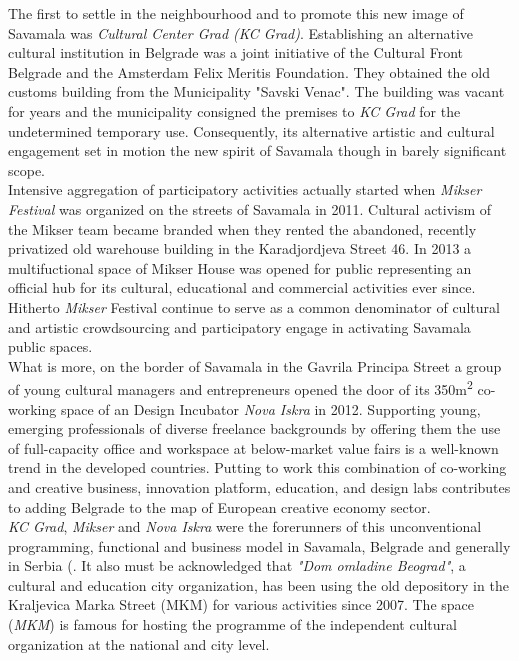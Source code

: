 \documentclass[11pt]{report}
\begin{document}
The first to settle in the neighbourhood and to promote this new image of Savamala was \textit{Cultural Center Grad (KC Grad)}. Establishing an alternative cultural institution in Belgrade was a joint initiative of the Cultural Front Belgrade and the Amsterdam Felix Meritis Foundation.
They obtained the old customs building from the Municipality "Savski Venac".
The building was vacant for years and the municipality consigned the premises to \textit{KC Grad} for the undetermined temporary use.
Consequently, its alternative artistic and cultural engagement set in motion the new spirit of Savamala though in barely significant scope.
\\
Intensive aggregation of participatory activities actually started when \textit{Mikser Festival} was organized on the streets of Savamala in 2011.
Cultural activism of the Mikser team became branded when they rented the abandoned, recently privatized old warehouse building in the Karadjordjeva Street 46.
In 2013 a multifuctional space of Mikser House was opened for public representing an official hub for its cultural, educational and commercial activities ever since. Hitherto \textit{Mikser} Festival continue to serve as a common denominator of cultural and artistic crowdsourcing and participatory engage in activating Savamala public spaces.
\\
What is more, on the border of Savamala in the Gavrila Principa Street a group of young cultural managers and entrepreneurs opened the door of its 350m\textsuperscript{2} co-working space of an Design Incubator \textit{Nova  Iskra} in 2012.
Supporting young, emerging professionals of diverse freelance backgrounds by offering them the use of full-capacity office and workspace at below-market value fairs is a well-known trend in the developed countries. Putting to work this combination of co-working and creative business, innovation platform, education, and design labs contributes to adding Belgrade to the map of European creative economy sector. 
\\
\textit{KC Grad}, \textit{Mikser} and \textit{Nova Iskra} were the forerunners of this unconventional programming, functional and business model in Savamala, Belgrade and generally in Serbia (\href{}{\citealt{doytchinov_urban_2015}}. %
It also must be acknowledged that \textit{"Dom omladine Beograd"}, a cultural and education city organization, has been using the old depository in the Kraljevica Marka Street (MKM) for various activities since 2007.
The space (\textit{MKM}) is famous for hosting the programme of the independent cultural organization at the national and city level.
\end{document}
